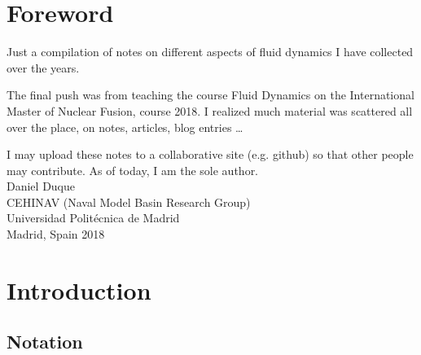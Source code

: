 \chapter*{Foreword}

Just a compilation of notes on different aspects of fluid
dynamics I have collected over the years.

The final push was from teaching the course Fluid Dynamics on the
International Master of Nuclear Fusion, course 2018. I realized much
material was scattered all over the place, on notes, articles, blog
entries \ldots

I may upload these notes to a collaborative site (e.g. github) so that
other people may contribute. As of today, I am the sole author.\\[4cm]

Daniel Duque \\
CEHINAV (Naval Model Basin Research Group) \\
Universidad Polit\'ecnica de Madrid \\
Madrid, Spain 2018




\chapter{Introduction}



\section{Notation}

